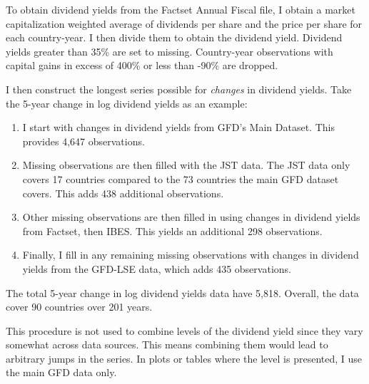\documentclass[12pt]{article}
\numberwithin{equation}{section}
\begin{document}
To obtain dividend yields from the Factset Annual Fiscal file, I obtain a market capitalization weighted average of dividends per share and the price per share for each country-year. I then divide them to obtain the dividend yield. Dividend yields greater than 35\% are set to missing. Country-year observations with capital gains in excess of 400\% or less than -90\% are dropped.

I then construct the longest series possible for \textit{changes} in dividend yields. Take the 5-year change in log dividend yields as an example:
\begin{enumerate}
	\item I start with changes in dividend yields from GFD's Main Dataset.  This provides 4,647 observations. 
	\item Missing observations are then filled with the JST data. The JST data only covers 17 countries compared to the 73 countries the main GFD dataset covers.  This adds 438 additional observations. 
	\item Other missing observations are then filled in using changes in dividend yields from Factset, then IBES. This yields an additional 298 observations. 
	\item  Finally, I fill in any remaining missing observations with changes in dividend yields from the GFD-LSE data, which adds 435 observations. 
\end{enumerate}
The total 5-year change in log dividend yields data have 5,818. Overall, the data cover 90 countries over 201 years.

This procedure is not used to combine levels of the dividend yield since they vary somewhat across data sources. This means combining them would lead to arbitrary jumps in the series. In plots or tables where the level is presented, I use the main GFD data only.
\end{document}
